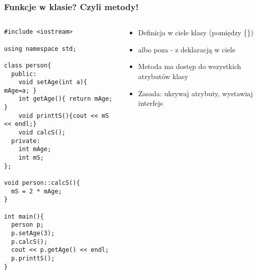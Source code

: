 \documentclass[10pt]{beamer}
\begin{document}
\begin{frame}[fragile]
  \frametitle{Funkcje w klasie? Czyli metody!}
  \begin{columns}
    \begin{column}{0.48\textwidth}
\begin{lstlisting}
#include <iostream>

using namespace std;

class person{
  public:
    void setAge(int a){ mAge=a; }
    int getAge(){ return mAge; }
    void printtS(){cout << mS << endl;}
    void calcS();
  private:
    int mAge;
    int mS;
};

void person::calcS(){
  mS = 2 * mAge;
}

int main(){
  person p;
  p.setAge(3);
  p.calcS();
  cout << p.getAge() << endl;
  p.printtS();
}


\end{lstlisting}
    \end{column}
    \begin{column}{0.48\textwidth}
      \begin{itemize}
        \item Definicja w ciele klasy (pomiędzy \{\})
        \item albo poza - z deklaracją w ciele
        \item Metoda ma dostęp do wszystkich atrybutów klasy  
        \item Zasada: ukrywaj atrybuty, wystawiaj interfejs     
      \end{itemize}
    \end{column}
  \end{columns}
\end{frame}
\end{document}
